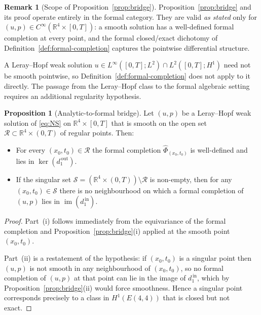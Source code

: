 \documentclass[reqno,10pt]{amsart}
\theoremstyle{definition}
\newtheorem{prop}[subsubsection]{Proposition}
\newtheorem{rem}[subsubsection]{Remark}
\begin{document}
\begin{rem}[Scope of Proposition~\ref{prop:bridge}]\label{rem:smooth-only}
Proposition~\ref{prop:bridge} and its proof operate entirely in the
formal category.  They are valid \emph{as stated} only for
$(u,p)\in C^\infty(\mathbb{R}^4\times[0,T])$: a smooth solution has a
well-defined formal completion at every point, and the formal closed/exact
dichotomy of Definition~\ref{def:formal-completion} captures the
pointwise differential structure.

A Leray--Hopf weak solution
$u\in L^\infty([0,T];L^2)\cap L^2([0,T];H^1)$
need not be smooth pointwise, so Definition~\ref{def:formal-completion}
does not apply to it directly.  The passage from the Leray--Hopf class
to the formal algebraic setting requires an additional regularity
hypothesis.
\end{rem}

\begin{prop}[Analytic-to-formal bridge]\label{prop:analytic-bridge}
Let $(u,p)$ be a Leray--Hopf weak solution of \eqref{eq:NS} on
$\mathbb{R}^4\times[0,T]$ that is smooth on the open set
$\mathcal{R}\subset\mathbb{R}^4\times(0,T)$ of regular points.  Then:
\begin{itemize}
\item[(i)] For every $(x_0,t_0)\in\mathcal{R}$ the formal completion
  $\widehat{\Phi}_{(x_0,t_0)}$ is well-defined and lies in
  $\ker(d_1^{\,\text{out}})$.
\item[(ii)] If the singular set $\mathcal{S} = (\mathbb{R}^4\times(0,T))\setminus\mathcal{R}$
  is non-empty, then for any $(x_0,t_0)\in\mathcal{S}$ there is no
  neighbourhood on which a formal completion of $(u,p)$ lies in
  $\operatorname{im}(d_1^{\,\text{in}})$.
\end{itemize}
\end{prop}

\begin{proof}
Part~(i) follows immediately from the equivariance of the formal completion
and Proposition~\ref{prop:bridge}(i) applied at the smooth point
$(x_0,t_0)$.

Part~(ii) is a restatement of the hypothesis: if $(x_0,t_0)$ is a
singular point then $(u,p)$ is not smooth in any neighbourhood of
$(x_0,t_0)$, so no formal completion of $(u,p)$ at that point can lie in
the image of $d_1^{\,\text{in}}$, which by Proposition~\ref{prop:bridge}(ii)
would force smoothness.  Hence a singular point corresponds precisely to a
class in $H^1(E(4,4))$ that is closed but not exact.
\end{proof}
\end{document}
